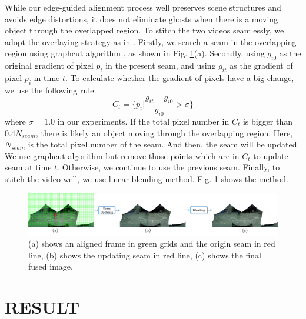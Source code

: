 \documentclass[conference]{IEEEtran}
\begin{document}
While our edge-guided alignment process well preserves scene structures and avoids edge distortions, it does not eliminate ghosts when there is a moving object through the overlapped region.
To stitch the two videos seamlessly, we adopt the overlaying strategy as in \cite{he2016parallax}. 
Firstly, we search a seam in the overlapping region using graphcut algorithm \cite{boykov2004experimental}, as shown in Fig. \ref{fig:p24}(a).
Secondly, using $g_{i0}$ as the original gradient of pixel $p_i$ in the present seam, and using $g_{it}$ as the gradient of pixel $p_i$ in time $t$. To calculate whether the gradient
of pixels have a big change, we use the following rule:
\begin{equation}
\textit{C}_{t}=\{p_{i}|\frac{g_{it}-g_{i0}}{g_{i0}}>\sigma\}
\end{equation}
where $\sigma=1.0$ in our experiments.
If the total pixel number in $\textit{C}_t$ is bigger than $0.4N_{seam}$, there is likely an object moving through the overlapping region. Here, $N_{seam}$ is the total pixel number of the seam. 
And then, the seam will be updated. We use graphcut algorithm but remove those points which are in $C_t$ to update seam at time $t$. 
Otherwise, we continue to use the previous seam.
Finally, to stitch the video well, we use linear blending method.
Fig. \ref{fig:p24} shows the method.
\begin{figure}[h]
\centering
\includegraphics[scale=0.23]{picture47.png}
\caption{(a) shows an aligned frame in green grids and the origin seam in red line, (b) shows the updating seam in red line, (c) shows the final fused image.}
\label{fig:p24}
\end{figure}

\section{RESULT}
\label{sec:result}
\end{document}
